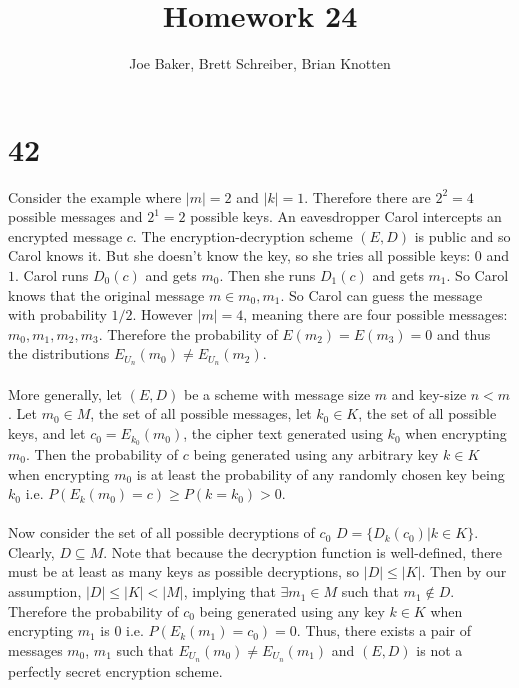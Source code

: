 \documentclass[letterpaper,notitlepage,twoside]{article}
\begin{document}
\title{Homework 24}
\author{Joe Baker, Brett Schreiber, Brian Knotten}
\maketitle

\section*{42}
Consider the example where $|m| = 2$ and $|k| = 1$. Therefore there are $2^2 = 4$ possible messages and $2^1 = 2$ possible keys. An eavesdropper Carol intercepts an encrypted message $c$. The encryption-decryption scheme $(E, D)$ is public and so Carol knows it. But she doesn't know the key, so she tries all possible keys: $0$ and $1$. Carol runs $D_0(c)$ and gets $m_0$. Then she runs $D_1(c)$ and gets $m_1$. So Carol knows that the original message $m \in {m_0, m_1}$. So Carol can guess the message with probability $1/2$. However $|m| = 4$, meaning there are four possible messages: $m_0, m_1, m_2, m_3$. Therefore the probability of $E(m_2) = E(m_3) = 0$ and thus the distributions $E_{U_{n}}(m_0) \neq E_{U_{n}}(m_2)$. \\\\
More generally, let $(E, D)$ be a scheme with message size $m$ and key-size $n < m$. Let $m_{0} \in M$, the set of all possible messages, let $k_0 \in K$, the set of all possible keys, and let $c_{0} = E_{k_0}(m_0)$, the cipher text generated using $k_0$ when encrypting $m_0$. Then the probability of $c$ being generated using any arbitrary key $k \in K$ when encrypting $m_0$ is at least the probability of any randomly chosen key being $k_0$ i.e. $P(E_k(m_0) = c) \geq P(k = k_0) > 0$. \\\\
Now consider the set of all possible decryptions of $c_0$ $D=\{D_k(c_0) | k \in K\}$. Clearly, $D \subseteq M$. Note that because the decryption function is well-defined, there must be at least as many keys as possible decryptions, so $|D| \leq |K|$. Then by our assumption, $|D| \leq |K| < |M|$, implying that $\exists m_1 \in M$ such that $m_1 \notin D$. Therefore the probability of $c_0$ being generated using any key $k \in K$ when encrypting $m_1$ is 0 i.e. $P(E_k(m_1) = c_0) = 0$. Thus, there exists a pair of messages $m_0$, $m_1$ such that $E_{U_n}(m_0) \neq E_{U_n}(m_1)$ and $(E, D)$ is not a perfectly secret encryption scheme.
\end{document}
